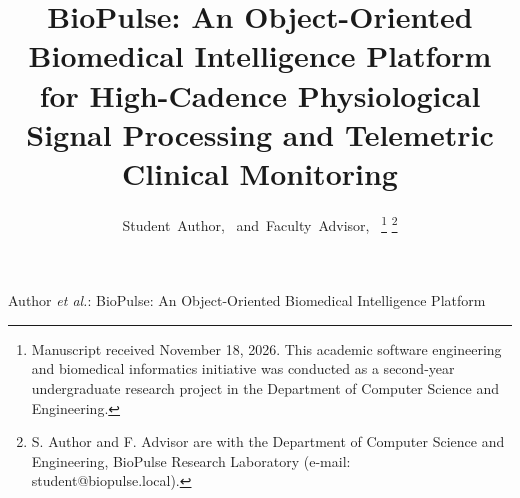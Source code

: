 \documentclass[10pt,journal,compsoc]{IEEEtran}
\begin{document}
\title{BioPulse: An Object-Oriented Biomedical Intelligence Platform for High-Cadence Physiological Signal Processing and Telemetric Clinical Monitoring}

\author{Student~Author,~
        and~Faculty~Advisor,~%
\thanks{Manuscript received November 18, 2026. This academic software engineering and biomedical informatics initiative was conducted as a second-year undergraduate research project in the Department of Computer Science and Engineering.}%
\thanks{S. Author and F. Advisor are with the Department of Computer Science and Engineering, BioPulse Research Laboratory (e-mail: student@biopulse.local).}%
}

%
{Author \MakeLowercase{\textit{et al.}}: BioPulse: An Object-Oriented Biomedical Intelligence Platform}
\end{document}
